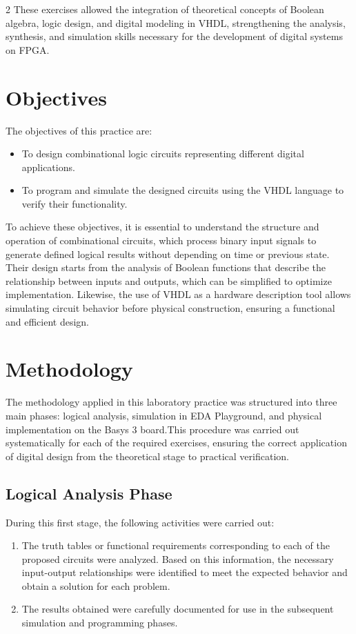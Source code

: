 \documentclass{article}
\begin{document}
\begin{multicols}{2}
These exercises allowed the integration of theoretical concepts of Boolean algebra, logic design, and digital modeling in VHDL, strengthening the analysis, synthesis, and simulation skills necessary for the development of digital systems on FPGA. 

\section{Objectives}\label{Objectives}  
The objectives of this practice are: 
\begin{itemize}
  \item To design combinational logic circuits representing different digital applications. 
  \item To program and simulate the designed circuits using the VHDL language to verify their functionality. 
\end{itemize}
To achieve these objectives, it is essential to understand the structure and operation of combinational circuits, which process binary input signals to generate defined logical results without depending on time or previous state. Their design starts from the analysis of Boolean functions that describe the relationship between inputs and outputs, which can be simplified to optimize implementation. Likewise, the use of VHDL as a hardware description tool allows simulating circuit behavior before physical construction, ensuring a functional and efficient design. 

\section{Methodology}\label{Meth}
The methodology applied in this laboratory practice was structured into three main phases: logical analysis, simulation in EDA Playground, and physical implementation on the Basys 3 board.This procedure was carried out systematically for each of the required exercises, ensuring the correct application of digital design from the theoretical stage to practical verification. 

\subsection{Logical Analysis Phase}
During this first stage, the following activities were carried out:
\begin{enumerate}
    \item The truth tables or functional requirements corresponding to each of the proposed circuits were analyzed. Based on this information, the necessary input-output relationships were identified to meet the expected behavior and obtain a solution for each problem. 
    \item The results obtained were carefully documented for use in the subsequent simulation and programming phases. 
\end{enumerate}


\end{multicols}
\end{document}

